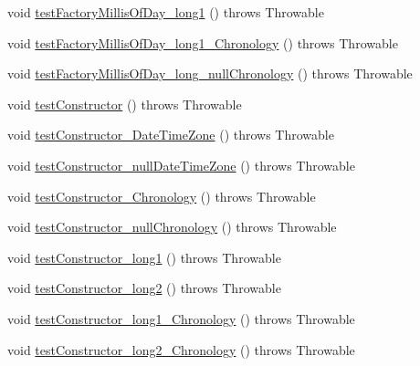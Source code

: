 \begin{DoxyCompactItemize}
\item 
void \hyperlink{classorg_1_1joda_1_1time_1_1_test_time_of_day___constructors_a1e019415cf1dbecba2b0dc2b5bdd7055}{test\-Factory\-Millis\-Of\-Day\-\_\-long1} ()  throws Throwable 
\item 
void \hyperlink{classorg_1_1joda_1_1time_1_1_test_time_of_day___constructors_aee598f3905e33a92a2af5a738e1074f7}{test\-Factory\-Millis\-Of\-Day\-\_\-long1\-\_\-\-Chronology} ()  throws Throwable 
\item 
void \hyperlink{classorg_1_1joda_1_1time_1_1_test_time_of_day___constructors_af857e937dc0084a782e6a3dac15c1bd7}{test\-Factory\-Millis\-Of\-Day\-\_\-long\-\_\-null\-Chronology} ()  throws Throwable 
\item 
void \hyperlink{classorg_1_1joda_1_1time_1_1_test_time_of_day___constructors_a789185d5a52126532e5d25d7fa1aaaed}{test\-Constructor} ()  throws Throwable 
\item 
void \hyperlink{classorg_1_1joda_1_1time_1_1_test_time_of_day___constructors_a88125ab138a2404368dd498bd5d13681}{test\-Constructor\-\_\-\-Date\-Time\-Zone} ()  throws Throwable 
\item 
void \hyperlink{classorg_1_1joda_1_1time_1_1_test_time_of_day___constructors_abeb278ff590fe0a3b42bc57a29c8e26f}{test\-Constructor\-\_\-null\-Date\-Time\-Zone} ()  throws Throwable 
\item 
void \hyperlink{classorg_1_1joda_1_1time_1_1_test_time_of_day___constructors_a3ac1a7ecbd4f40fc08f87bb639d85578}{test\-Constructor\-\_\-\-Chronology} ()  throws Throwable 
\item 
void \hyperlink{classorg_1_1joda_1_1time_1_1_test_time_of_day___constructors_adfde65239b63417f9e85e2e59092d1a5}{test\-Constructor\-\_\-null\-Chronology} ()  throws Throwable 
\item 
void \hyperlink{classorg_1_1joda_1_1time_1_1_test_time_of_day___constructors_aad9354de9dea614880e46bf6ff2ad7cb}{test\-Constructor\-\_\-long1} ()  throws Throwable 
\item 
void \hyperlink{classorg_1_1joda_1_1time_1_1_test_time_of_day___constructors_a37aa78362391f35cc7b213180da23187}{test\-Constructor\-\_\-long2} ()  throws Throwable 
\item 
void \hyperlink{classorg_1_1joda_1_1time_1_1_test_time_of_day___constructors_aff9f8149d8d99216707b1f4e5e0f6aec}{test\-Constructor\-\_\-long1\-\_\-\-Chronology} ()  throws Throwable 
\item 
void \hyperlink{classorg_1_1joda_1_1time_1_1_test_time_of_day___constructors_a181455b12b37c00a7bcdc17608952fb8}{test\-Constructor\-\_\-long2\-\_\-\-Chronology} ()  throws Throwable 

\end{DoxyCompactItemize}
